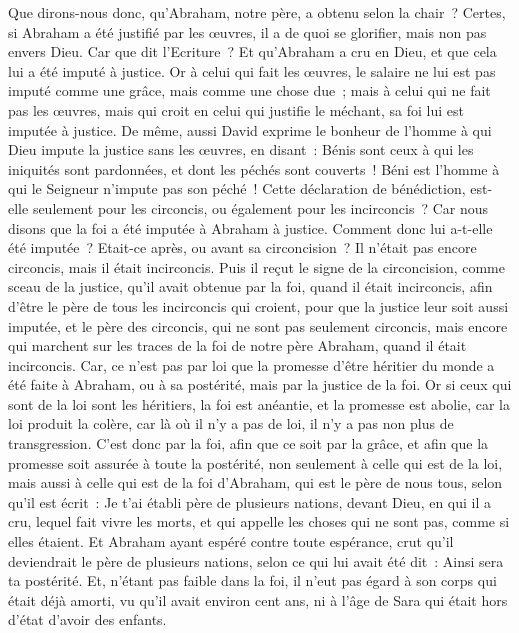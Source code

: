 \begin{multicols}{2}
\VerseOne{}Que dirons-nous donc, qu'Abraham, notre père, a obtenu selon la chair~?
Certes, si Abraham a été justifié par les œuvres, il a de quoi se glorifier, mais non pas envers Dieu.
Car que dit l'Ecriture~? Et qu'Abraham a cru en Dieu, et que cela lui a été imputé à justice.
Or à celui qui fait les œuvres, le salaire ne lui est pas imputé comme une grâce, mais comme une chose due~;
mais à celui qui ne fait pas les œuvres, mais qui croit en celui qui justifie le méchant, sa foi lui est imputée à justice.
De même, aussi David exprime le bonheur de l'homme à qui Dieu impute la justice sans les œuvres, en disant~:
Bénis sont ceux à qui les iniquités sont pardonnées, et dont les péchés sont couverts~!
Béni est l'homme à qui le Seigneur n'impute pas son péché~!
Cette déclaration de bénédiction, est-elle seulement pour les circoncis, ou également pour les incirconcis~? Car nous disons que la foi a été imputée à Abraham à justice.
Comment donc lui a-t-elle été imputée~? Etait-ce après, ou avant sa circoncision~? Il n'était pas encore circoncis, mais il était incirconcis.
Puis il reçut le signe de la circoncision, comme sceau de la justice, qu'il avait obtenue par la foi, quand il était incirconcis, afin d'être le père de tous les incirconcis qui croient, pour que la justice leur soit aussi imputée,
et le père des circoncis, qui ne sont pas seulement circoncis, mais encore qui marchent sur les traces de la foi de notre père Abraham, quand il était incirconcis.
Car, ce n'est pas par loi que la promesse d'être héritier du monde a été faite à Abraham, ou à sa postérité, mais par la justice de la foi.
Or si ceux qui sont de la loi sont les héritiers, la foi est anéantie, et la promesse est abolie,
car la loi produit la colère, car là où il n'y a pas de loi, il n'y a pas non plus de transgression.
C'est donc par la foi, afin que ce soit par la grâce, et afin que la promesse soit assurée à toute la postérité, non seulement à celle qui est de la loi, mais aussi à celle qui est de la foi d'Abraham, qui est le père de nous tous,
selon qu'il est écrit~: Je t'ai établi père de plusieurs nations, devant Dieu, en qui il a cru, lequel fait vivre les morts, et qui appelle les choses qui ne sont pas, comme si elles étaient.
Et Abraham ayant espéré contre toute espérance, crut qu'il deviendrait le père de plusieurs nations, selon ce qui lui avait été dit~: Ainsi sera ta postérité.
Et, n'étant pas faible dans la foi, il n'eut pas égard à son corps qui était déjà amorti, vu qu'il avait environ cent ans, ni à l'âge de Sara qui était hors d'état d'avoir des enfants.

\end{multicols}
